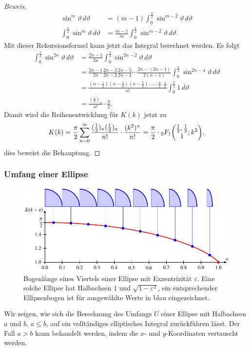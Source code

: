 \begin{proof}[Beweis]
\begin{align*}
\sin^{m} \vartheta\,d\vartheta
&=
(m-1)
\int_0^{\frac{\pi}2}
\sin^{m-2} \vartheta\,d\vartheta
\\
\int_0^{\frac{\pi}2}
\sin^{m} \vartheta\,d\vartheta
&=
\frac{m-1}{m}
\int_0^{\frac{\pi}2}
\sin^{m-2} \vartheta\,d\vartheta.
\end{align*}
Mit dieser Rekursionsformel kann jetzt das Integral berechnet werden.
Es folgt
\begin{align*}
\int_0^{\frac{\pi}2}
\sin^{2n}\vartheta\,d\vartheta
&=
\frac{2n-1}{2n}
\int_0^{\frac{\pi}2}
\sin^{2n-2}\vartheta\,d\vartheta
\\
&=
\frac{2n-1}{2n}
\frac{2n-3}{2n-2}
\frac{2n-5}{2n-4}
\cdots
\frac{2n-(2n-1)}{2(n-1)}
\int_0^{\frac{\pi}2}
\sin^{2n-4}\vartheta\,d\vartheta
\\
&=
\frac{
(n-\frac12)(n-\frac32)(n-\frac52)\cdot\ldots\cdot\frac32\cdot\frac12
}{
n!
}
\int_0^{\frac{\pi}2} 1\,d\vartheta
\\
&=
\frac{(\frac12)_n}{n!}
\cdot
\frac{\pi}2.
\end{align*}
Damit wird die Reihenentwicklung für $K(k)$ jetzt zu
\[
K(k)
=
\frac{\pi}2
\sum_{n=0}^\infty
\frac{(\frac12)_n(\frac12)_n}{n!} \cdot \frac{(k^2)^n}{n!}
=
\frac{\pi}2
\cdot
\mathstrut_2F_1\biggl(\begin{matrix}\frac12,\frac12\\1\end{matrix};k^2\biggr),
\]
dies beweist die Behauptung.
\end{proof}

%
%
\subsubsection{Umfang einer Ellipse}
\begin{figure}
\centering
\includegraphics{chapters/110-elliptisch/images/ellipsenumfang.pdf}
\caption{Bogenlänge eines Viertels einer Ellipse mit Exzentrizität
$\varepsilon$.
Eine solche Ellipse hat Halbachsen $1$ und $\sqrt{1-\varepsilon^2}$,
ein entsprechender Ellipsenbogen ist für ausgewählte Werte in blau
eingezeichnet.
\label{buch:elliptisch:fig:ellipsenumfang}}
\end{figure}
Wir zeigen, wie sich die Berechnung des Umfangs $U$ einer Ellipse
mit Halbachsen $a$ und $b$, $a\le b$, auf ein volltändiges elliptisches
Integral zurückführen lässt.
Der Fall $a>b$ kann behandelt werden, indem die $x$- und $y$-Koordinaten
vertauscht werden.


